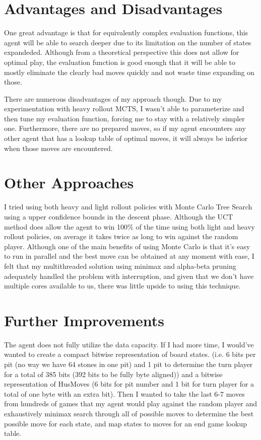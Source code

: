 \documentclass{article}
\begin{document}
\section{Advantages and Disadvantages}
One great advantage is that for equivalently complex evaluation functions, this agent will be able to search deeper due to its limitation on the number of states expandeded. Although from a
theoretical perspective this does not allow for optimal play, the evaluation function is good enough that it will be able to mostly eliminate the clearly bad moves quickly and not waste time
expanding on those.

There are numerous disadvantages of my approach though. Due to my experimentation with heavy rollout MCTS, I wasn't able to parameterize and then tune my evaluation function, forcing me to stay
with a relatively simpler one. Furthermore, there are no prepared moves, so if my agent encounters any other agent that has a lookup table of optimal moves, it will always be inferior when those
moves are encountered.

\section{Other Approaches}
I tried using both heavy and light rollout policies with Monte Carlo Tree Search using a upper confidence bounds in the descent phase. Although the UCT method does allow the agent
to win 100\% of the time using both light and heavy rollout policies, on average it takes twice as long to win against the random player.
Although one of the main benefits of using Monte Carlo is that it's easy to run in parallel and the best move can be obtained at any moment with ease,
I felt that my multithreaded solution using minimax and alpha-beta pruning adequately handled the problem with interruption, and given that we don't have multiple cores available to us,
there was little upside to using this technique.  

\section{Further Improvements}
The agent does not fully utilize the data capacity. If I had more time, I would've wanted to create a compact bitwise representation of board states. (i.e. 6 bits per pit (no way we have 64 stones
in one pit) and 1 pit to determine the turn player for a total of 385 bits (392 bits to be fully byte aligned)) and a bitwise representation of HusMoves (6 bits for pit number and 1 bit for turn player
for a total of one byte with an extra bit). Then I wanted to take the last 6-7 moves from hundreds of games that my agent would play against the random player and exhaustively
minimax search through all of possible moves to determine the best possible move for each state, and map states to moves for an end game lookup table.
\end{document}
